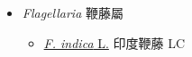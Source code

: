 
  \begin{itemize}
 \item[] \textit{Flagellaria} 鞭藤屬
                                
  \begin{itemize}
        \item[] \href{http://www.theplantlist.org/tpl1.1/search?q=Flagellaria+indica}{\textit{F. indica} L.}   印度鞭藤   LC
  \end{itemize}
  \end{itemize}
